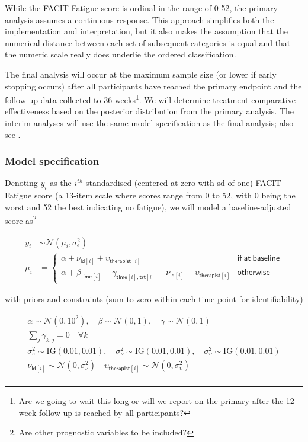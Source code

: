 \documentclass[
]{article}
\begin{document}
While the FACIT-Fatigue score is ordinal in the range of 0-52, the primary analysis assumes a continuous response.
This approach simplifies both the implementation and interpretation, but it also makes the assumption that the numerical distance between each set of subsequent categories is equal and that the numeric scale really does underlie the ordered classification.

The final analysis will occur at the maximum sample size (or lower if early stopping occurs) after all participants have reached the primary endpoint and the follow-up data collected to 36 weeks\footnote{Are we going to wait this long or will we report on the primary after the 12 week follow up is reached by all participants?}.
We will determine treatment comparative effectiveness based on the posterior distribution from the primary analysis.
The interim analyses will use the same model specification as the final analysis; also see .

\hypertarget{model-specification}{%
\subsubsection{Model specification}\label{model-specification}}

Denoting $y_{i}$ as the $i^{th}$ standardised (centered at zero with sd of one) FACIT-Fatigue score (a 13-item scale where scores range from 0 to 52, with 0 being the worst and 52 the best indicating no fatigue), we will model a baseline-adjusted score as\footnote{Are other prognostic variables to be included?}

\[
\begin{aligned}
y_{i} &\sim \mathcal{N}(\mu_{i}, \sigma_e^2) \\
\mu_i &= \begin{cases}
      \alpha + \nu_{\mathsf{id}[i]} + \upsilon_{\mathsf{therapist}[i]} & \mathsf{if \ at \ baseline} \\
      \alpha + \beta_{\mathsf{time}[i]} + \gamma_{\mathsf{time}[i],\mathsf{trt}[i]} + \nu_{\mathsf{id}[i]} + \upsilon_{\mathsf{therapist}[i]}  & \mathsf{otherwise}
    \end{cases}
\end{aligned}
\]

with priors and constraints (sum-to-zero within each time point for identifiability)

\begin{gather*}
\alpha \sim \mathcal{N}(0, 10^2), \quad \beta \sim \mathcal{N}(0, 1), \quad \gamma \sim \mathcal{N}(0, 1) \\
\sum_j \gamma_{k,j} = 0 \quad \forall k  \\
\sigma_e^2 \sim \text{IG}(0.01, 0.01), \quad \sigma_\nu^2 \sim \text{IG}(0.01, 0.01), \quad \sigma_\upsilon^2 \sim \text{IG}(0.01, 0.01) \\
\nu_{\mathsf{id}[i]} \sim \mathcal{N}(0, \sigma_\nu^2) \quad \upsilon_{\mathsf{therapist}[i]} \sim \mathcal{N}(0, \sigma_\upsilon^2) \\
\end{gather*}
\end{document}
